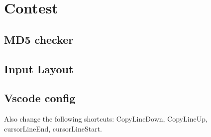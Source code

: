 \chapter{Contest}


\section{MD5 checker}

\section{Input Layout}

\section{Vscode config}
Also change the following shortcuts: CopyLineDown, CopyLineUp, cursorLineEnd, cursorLineStart.

